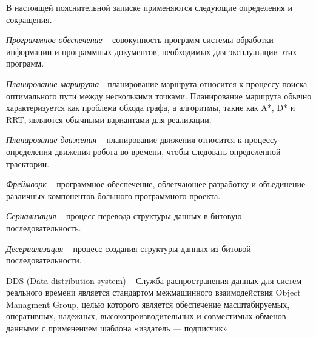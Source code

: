 



\setlength{\intextsep}{\baselineskip}
\setlength{\abovecaptionskip}{\baselineskip}

\def \appname {ПСНМС}
\def \diplomaname {программное средство навигации мобильных систем}
\def \diplomanameR {программного средства навигации мобильных систем}
\def \ros {ROS}
\def \rosTwo {ROS2}

\newcommand{\todo}[1]{\textcolor{red}{TODO: #1}}
\newcommand{\review}[1]{\textcolor{green}{#1}}

\def \nr {\todo{need reference?}}


В настоящей пояснительной записке применяются следующие определения и
сокращения.

\textit{Программное обеспечение} -- совокупность программ системы обработки
информации и программных документов, необходимых для эксплуатации этих
программ.

\textit{Планирование маршрута} - планирование маршрута относится к процессу
поиска оптимального пути между несколькими точками. Планирование маршрута обычно
характеризуется как проблема обхода графа, а алгоритмы, такие как A*, D* и RRT,
являются обычными вариантами для реализации.

\textit{Планирование движения} -- планирование движения относится к процессу
определения движения робота во времени, чтобы следовать определенной
траектории.

\textit{Фреймворк} -- программное обеспечение, облегчающее разработку и
объединение различных компонентов большого программного проекта.

\textit{Сериализация} -- процесс перевода структуры данных в битовую последовательность.

\textit{Десериализация} -- процесс создания структуры данных из битовой последовательности. .

DDS (Data distribution system) -- Служба распространения данных для систем
реального времени является стандартом межмашинного взаимодействия Object
Managment Group, целью которого является обеспечение масштабируемых,
оперативных, надежных, высокопроизводительных и совместимых обменов данными с
применением шаблона «издатель — подписчик»

